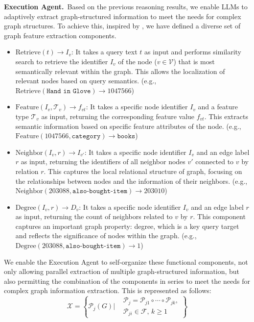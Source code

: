 \documentclass[11pt]{article}
\begin{document}
\noindent\textbf{Execution Agent.} \,Based on the previous reasoning results, we enable LLMs to adaptively extract graph-structured information to meet the needs for complex graph structures. To achieve this, inspired by \citep{DBLP:conf/acl/JinXZRZL0TWM024}, we have defined a diverse set of graph feature extraction components.
\begin{itemize}
    \item $\mathrm{Retrieve}(t)\rightarrow I_v$: It takes a query text $t$ as input and performs similarity search to retrieve the identifier $I_v$ of the node ($v \in \mathcal{V}$) that is most semantically relevant within the graph. This allows the localization of relevant nodes based on query semantics. (e.g., $\mathrm{Retrieve}(\texttt{Hand in Glove}) \rightarrow 1047566$)
    \item $\mathrm{Feature}({I}_v,\mathcal{T}_v)\rightarrow f_{vt}$: It takes a specific node identifier $I_v$ and a feature type $\mathcal{T}_v$ as input, returning the corresponding feature value $f_{vt}$. This extracts semantic information based on specific feature attributes of the node. (e.g., $\mathrm{Feature}(1047566, \texttt{category}) \rightarrow \texttt{books}$)
    \item $\mathrm{Neighbor}(I_v,r)\rightarrow I_{v'}$: It takes a specific node identifier $I_v$ and an edge label $r$ as input, returning the identifiers of all neighbor nodes $v'$ connected to $v$ by relation $r$. This captures the local relational structure of graph, focusing on the relationships between nodes and the information of their neighbors. (e.g., $\mathrm{Neighbor}(203088, \texttt{also-bought-item}) \rightarrow 203010$)
    \item $\mathrm{Degree}(I_v,r)\rightarrow D_v$: It takes a specific node identifier $I_v$ and an edge label $r$ as input, returning the count of neighbors related to $v$ by $r$. This component captures an important graph property: degree, which is a key query target and reflects the significance of nodes within the graph. (e.g., $\mathrm{Degree}(203088, \texttt{also-bought-item}) \rightarrow 1$)
\end{itemize}

We enable the Execution Agent to self-organize these functional components, not only allowing parallel extraction of multiple graph-structured information, but also permitting the combination of the components in series to meet the needs for complex graph information extraction. This is represented as follows:
\begin{equation}
\mathcal{X} = \left\{ \mathcal{P}_j(G)  \bigg | 
\begin{aligned}
    &\mathcal{P}_j = \mathcal{P}_{j1} \circ \cdots \circ \mathcal{P}_{jk}, \\
    &\mathcal{P}_{ji} \in \mathcal{F}, \, k \geq 1
\end{aligned}
\right\} \label{GKE}
\end{equation}
\end{document}
